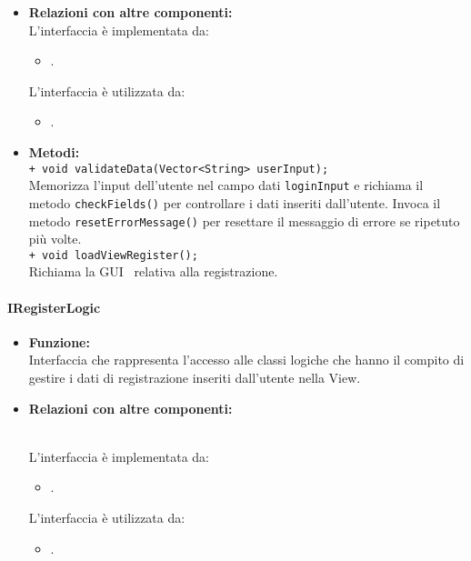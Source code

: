 {{\begin{sloppypar}
{{{\begin{itemize}
				\item[] \textbf{Relazioni con altre componenti:}\\
				L'interfaccia è implementata da:
				\begin{itemize}
				 	\item[]	.
				\end{itemize}	
				L'interfaccia è utilizzata da:
				\begin{itemize}
					\item[] .\\
				\end{itemize}
			
				\item[] \textbf{Metodi:}{\\
					\texttt{+ void validateData(Vector<String> userInput);} \\
					Memorizza l'input dell'utente nel campo dati \texttt{loginInput} e richiama il metodo \texttt{checkFields()} per controllare i dati inseriti dall'utente. Invoca il metodo \texttt{resetErrorMessage()} per resettare il messaggio di errore se ripetuto più volte.\\
					
					\texttt{+ void loadViewRegister();}\\
					Richiama la GUI\g~ relativa alla registrazione.\\
				}
			\end{itemize}
			}
			
		

			\paragraph{IRegisterLogic}\label{par:IRegisterLogic}{
			\begin{itemize}
			
				\item[] \textbf{Funzione:}\\
				Interfaccia che rappresenta l'accesso alle classi logiche che hanno il compito di gestire i dati di registrazione inseriti dall'utente nella View.\\
			
				\item[] \textbf{Relazioni con altre componenti:}{\\
				L'interfaccia è implementata da:
				\begin{itemize}
				 	\item[] .
				\end{itemize}
				L'interfaccia è utilizzata da:
				\begin{itemize}
					\item[] .\\
				\end{itemize}
				}
			

\end{itemize}}}}
\end{sloppypar}}}
